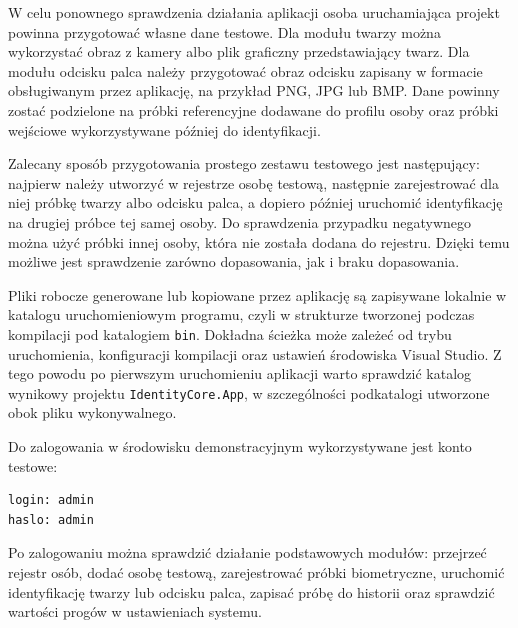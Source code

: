 W celu ponownego sprawdzenia działania aplikacji osoba uruchamiająca projekt powinna przygotować własne dane testowe. Dla modułu twarzy można wykorzystać obraz z kamery albo plik graficzny przedstawiający twarz. Dla modułu odcisku palca należy przygotować obraz odcisku zapisany w formacie obsługiwanym przez aplikację, na przykład PNG, JPG lub BMP. Dane powinny zostać podzielone na próbki referencyjne dodawane do profilu osoby oraz próbki wejściowe wykorzystywane później do identyfikacji.

Zalecany sposób przygotowania prostego zestawu testowego jest następujący: najpierw należy utworzyć w rejestrze osobę testową, następnie zarejestrować dla niej próbkę twarzy albo odcisku palca, a dopiero później uruchomić identyfikację na drugiej próbce tej samej osoby. Do sprawdzenia przypadku negatywnego można użyć próbki innej osoby, która nie została dodana do rejestru. Dzięki temu możliwe jest sprawdzenie zarówno dopasowania, jak i braku dopasowania.

Pliki robocze generowane lub kopiowane przez aplikację są zapisywane lokalnie w katalogu uruchomieniowym programu, czyli w strukturze tworzonej podczas kompilacji pod katalogiem \texttt{bin}. Dokładna ścieżka może zależeć od trybu uruchomienia, konfiguracji kompilacji oraz ustawień środowiska Visual Studio. Z tego powodu po pierwszym uruchomieniu aplikacji warto sprawdzić katalog wynikowy projektu \texttt{IdentityCore.App}, w szczególności podkatalogi utworzone obok pliku wykonywalnego.

Do zalogowania w środowisku demonstracyjnym wykorzystywane jest konto testowe:

\begin{lstlisting}[caption={Dane konta testowego operatora}, label={lst:konto-testowe}]
login: admin
haslo: admin
\end{lstlisting}

Po zalogowaniu można sprawdzić działanie podstawowych modułów: przejrzeć rejestr osób, dodać osobę testową, zarejestrować próbki biometryczne, uruchomić identyfikację twarzy lub odcisku palca, zapisać próbę do historii oraz sprawdzić wartości progów w ustawieniach systemu.
